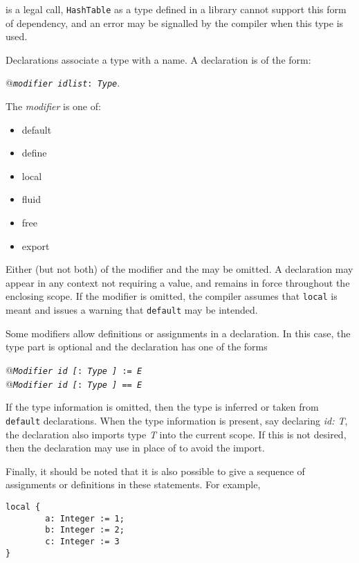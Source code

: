 is a legal call, {\tt HashTable} as a type defined in a library
cannot support this form of dependency, and
an error may be signalled by the compiler when this type is used.



Declarations associate a type with a name. A declaration is of the
form:

\verb@    @{\tt {\em modifier} {\em idlist}:~{\em Type}}.

The {\em modifier} is one of:
\begin{itemize}
\item default
\item define
\item local
\item fluid
\item free
\item export
\end{itemize}
Either (but not both) of the modifier and the  may be
omitted. A declaration may appear in any context not requiring a value,
and remains in force throughout the enclosing scope. If the modifier is
omitted, the compiler assumes that {\tt local} is meant and issues a
warning that {\tt default} may be intended.

Some modifiers allow definitions or assignments in a declaration.
In this case, the type part is optional and the declaration has one
of the forms

{\small\verb@    @{\tt {\em Modifier}~{\em id [}:~{\em Type ]} := {\em E}}} \\
{\small\verb@    @{\tt {\em Modifier}~{\em id [}:~{\em Type ]} == {\em E}}}


If the type information is omitted, then the type is inferred or
taken from {\tt default} declarations.
When the type information is present, say declaring {\em id: T},
the declaration also imports type {\em T} into the current scope.
If this is not desired, then the declaration may use \ttin{:*} in place
of \ttin{:} to avoid the import.

Finally, it should be noted that it is also possible to give a sequence
of assignments or definitions in these statements.  For example,

\begin{small}
\begin{verbatim}
local {
        a: Integer := 1;
        b: Integer := 2;
        c: Integer := 3
}
\end{verbatim}
\end{small}

